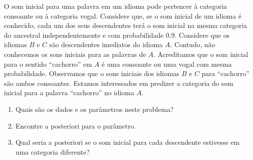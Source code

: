 \begin{exercise}
 O som inicial para uma palavra em 
 um idioma pode pertencer à categoria 
 consoante ou à categoria vogal. Considere que, 
 se o som inicial de um idioma é conhecido, 
 cada um dos seus descendentes terá o som inicial na
 mesma categoria do ancestral independentemente e 
 com probabilidade $0.9$.
 Considere que os idiomas $B$ e $C$ são 
 descendentes imediatos do idioma $A$.
 Contudo, não conhecemos os sons iniciais para 
 as palavras de $A$. Acreditamos que o som inicial para
 o sentido ``cachorro'' em $A$ é 
 uma consoante ou uma vogal com mesma probabilidade.
 Observamos que o sons iniciais dos
 idiomas $B$ e $C$ para ``cachorro'' são 
 ambos consoantes.
 Estamos interessados em predizer a 
 categoria do som inicial para 
 a palavra ``cachorro'' no idioma $A$.
 \begin{enumerate}[label=(\alph*)]
  \item Quais são os dados e 
  os parâmetros neste problema?
  \item Encontre a posteriori para o parâmetro.
  \item Qual seria a posteriori se 
  o som inicial para cada descendente estivesse 
  em uma categoria diferente?
 \end{enumerate}
\end{exercise}

